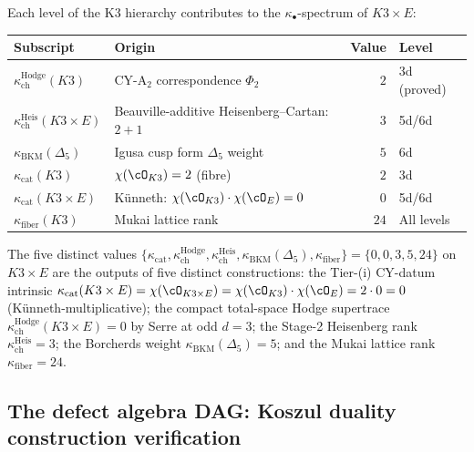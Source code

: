 \begin{remark}
\label{rem:kappa-k3-hierarchy}
Each level of the K3 hierarchy contributes to the $\kappa_\bullet$-spectrum of $K3 \times E$:
\begin{center}
\small
\renewcommand{\arraystretch}{1.3}
\begin{tabular}{llrl}
\toprule
\textbf{Subscript} & \textbf{Origin} & \textbf{Value} & \textbf{Level} \\
\midrule
$\kappa_{\mathrm{ch}}^{\mathrm{Hodge}}(K3)$ & CY-A$_2$ correspondence $\Phi_2$ & $2$ & 3d (proved) \\
$\kappa_{\mathrm{ch}}^{\mathrm{Heis}}(K3 \times E)$ & Beauville-additive Heisenberg--Cartan: $2 + 1$ & $3$ & 5d/6d \\
$\kappa_{\mathrm{BKM}}(\Delta_5)$ & Igusa cusp form $\Delta_5$ weight & $5$ & 6d \\
$\kappa_{\mathrm{cat}}(K3)$ & $\chi(\cO_{K3}) = 2$ (fibre) & $2$ & 3d \\
$\kappa_{\mathrm{cat}}(K3 \times E)$ & K\"unneth: $\chi(\cO_{K3}) \cdot \chi(\cO_E) = 0$ & $0$ & 5d/6d \\
$\kappa_{\mathrm{fiber}}(K3)$ & Mukai lattice rank & $24$ & All levels \\
\bottomrule
\end{tabular}
\end{center}
The five distinct values $\{\kappa_{\mathrm{cat}}, \kappa_{\mathrm{ch}}^{\mathrm{Hodge}}, \kappa_{\mathrm{ch}}^{\mathrm{Heis}}, \kappa_{\mathrm{BKM}}(\Delta_5), \kappa_{\mathrm{fiber}}\} = \{0, 0, 3, 5, 24\}$ on $K3 \times E$ are the outputs of five distinct constructions: the Tier-(i) CY-datum intrinsic $\kappa_{\mathrm{cat}}(K3 \times E) = \chi(\cO_{K3 \times E}) = \chi(\cO_{K3}) \cdot \chi(\cO_E) = 2 \cdot 0 = 0$ (K\"unneth-multiplicative); the compact total-space Hodge supertrace $\kappa_{\mathrm{ch}}^{\mathrm{Hodge}}(K3 \times E) = 0$ by Serre at odd $d = 3$; the Stage-2 Heisenberg rank $\kappa_{\mathrm{ch}}^{\mathrm{Heis}} = 3$; the Borcherds weight $\kappa_{\mathrm{BKM}}(\Delta_5) = 5$; and the Mukai lattice rank $\kappa_{\mathrm{fiber}} = 24$.
\end{remark}

\subsection{The defect algebra DAG: Koszul duality construction verification}
\label{subsec:defect-koszul-dag}

